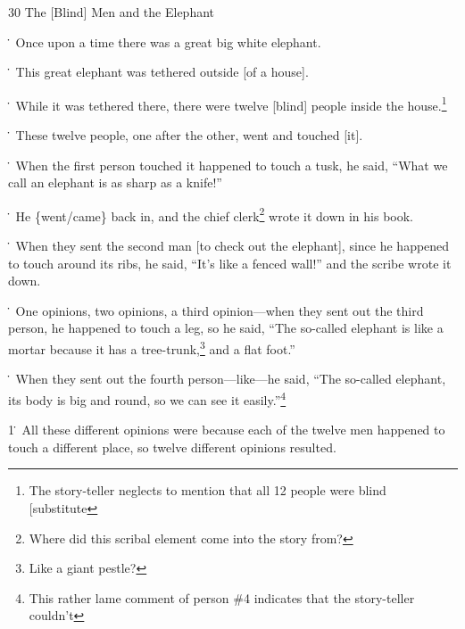 
30 The [Blind] Men and the Elephant

\. Once upon a time there was a great big white elephant.

\. This great elephant was tethered outside [of a house].

\. While it was tethered there, there were twelve [blind] people inside the house.\footnote{The story-teller neglects to mention that all 12 people were blind [substitute}

\. These twelve people, one after the other, went and touched [it].

\. When the first person touched it happened to touch a tusk, he said, ``What we
call an elephant is as sharp as a knife!''

\. He \{went/came\} back in, and the chief clerk\footnote{Where did this scribal element come into the story from?} wrote it down in his book.

\. When they sent the second man [to check out the elephant], since he happened
to touch around its ribs, he said, ``It's like a fenced wall!'' and the scribe
wrote it down.

\. One opinions, two opinions, a third opinion---when they sent out the third person,
he happened to touch a leg, so he said, ``The so-called elephant is like a mortar
because it has a tree-trunk,\footnote{Like a giant pestle?} and a flat foot.''

\. When they sent out the fourth person---like---he said, ``The so-called elephant,
its body is big and round, so we can see it easily.''\footnote{This rather lame comment of person \#4 indicates that the story-teller couldn't}

1\. All these different opinions were because each of the twelve men happened to
touch a different place, so twelve different opinions resulted.


